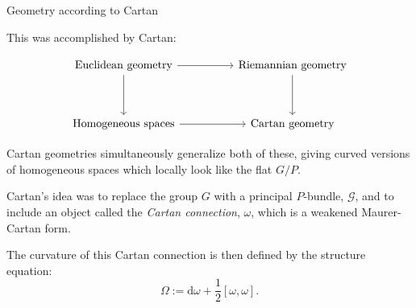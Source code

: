 \documentclass{beamer}
\begin{document}
\begin{frame}{Geometry according to Cartan}

  This was accomplished by Cartan:

\[
\begin{tikzcd}[ampersand replacement=\&, row sep=huge, column sep=huge]
\textnormal{Euclidean geometry} \arrow[r] \arrow[d] \& \textnormal{Riemannian geometry} \arrow[d]\\
\textnormal{Homogeneous spaces} \arrow[r] \& \textnormal{Cartan geometry}
\end{tikzcd}
\]

\pause
Cartan geometries simultaneously generalize both of these, giving curved versions of homogeneous spaces which locally look like the flat \( G/P \).

Cartan's idea was to replace the group $G$ with a principal $P$-bundle, \(
\mathcal{G} \), and to include an object called the \emph{Cartan connection},
$\omega$, which is a weakened Maurer-Cartan form. 

The curvature of this Cartan connection is then defined by the structure
equation:
\[
  \Omega := \mathrm{d} \omega + \dfrac{1}{2} [\omega, \omega].
\]

\end{frame}
\end{document}

